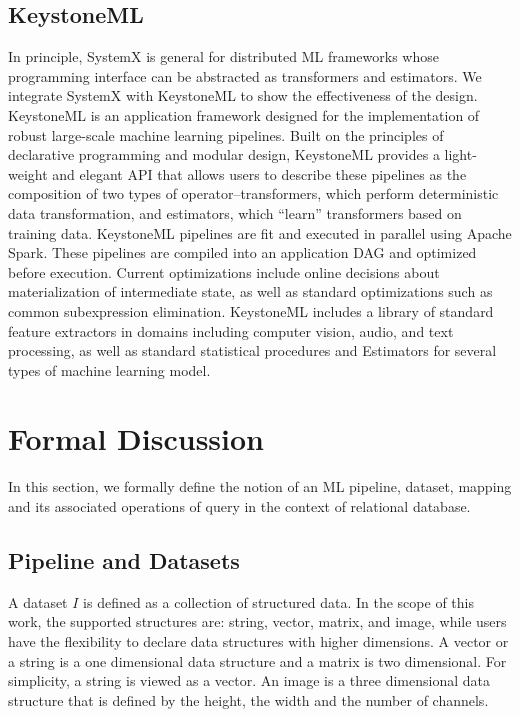 \documentclass{sig-alternate}
\begin{document}
\subsection{KeystoneML}
In principle, SystemX is general for distributed ML frameworks whose programming interface can be abstracted as transformers and estimators.
We integrate SystemX with KeystoneML to show the effectiveness of the design.
KeystoneML is an application framework designed for the implementation of robust large-scale machine learning pipelines. Built on the principles of declarative programming and modular design, KeystoneML provides a light-weight and elegant API that allows users to describe these pipelines as the composition of two types of operator--transformers, which perform deterministic data transformation, and estimators, which ``learn'' transformers based on training data. KeystoneML pipelines are fit and executed in parallel using Apache Spark. These pipelines are compiled into an application DAG and optimized before execution. Current optimizations include online decisions about materialization of intermediate state, as well as standard optimizations such as common subexpression elimination. KeystoneML includes a library of standard feature extractors in domains including computer vision, audio, and text processing, as well as standard statistical procedures and Estimators for several types of machine learning model.


\section{Formal Discussion}
\label{sec:Mapping}
In this section, we formally define the notion of an ML pipeline, dataset, mapping and its associated operations of query in the context of 
relational database.

\subsection{Pipeline and Datasets}
\label{sec:Map-Pipe-Data}
A dataset $I$ is defined as a collection of structured data. In the scope of this work, the supported structures are: 
string, vector, matrix, and image, while users have the flexibility to declare data structures with higher dimensions.
A vector or a string is a one dimensional data structure and a matrix is two dimensional. 
For simplicity, a string is viewed as a vector.
An image is a three dimensional data structure that is defined by the height, the width and the number
of channels. 
\end{document}
